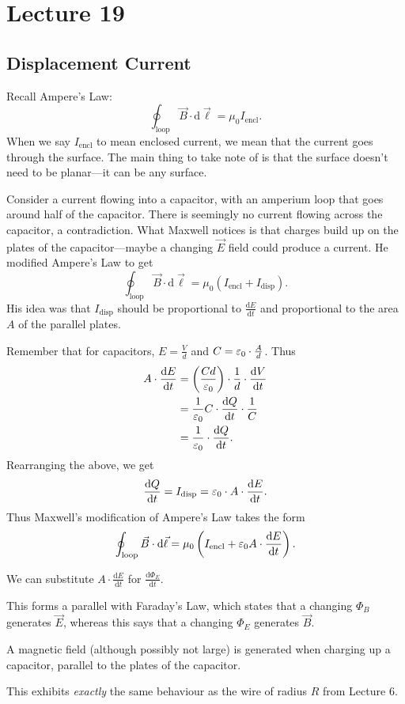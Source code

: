 \documentclass[class=article, crop=false]{standalone}
\begin{document}
  \section{Lecture 19}
  \subsection{Displacement Current}
  Recall Ampere's Law:
  \[
    \oint_\text{loop}\vec{B}\cdot \mathrm{d}\vec{\ell} = \mu_0I_\text{encl}.
  \]
  When we say $I_\text{encl}$ to mean enclosed current, we mean that the current goes through the surface. The main thing to take note of is that the surface doesn't need to be planar---it can be any surface. \par
  Consider a current flowing into a capacitor, with an amperium loop that goes around half of the capacitor. There is seemingly no current flowing across the capacitor, a contradiction. What Maxwell notices is that charges build up on the plates of the capacitor---maybe a changing $\vec{E}$ field could produce a current. He modified Ampere's Law to get
  \[
    \oint_\text{loop}\vec{B}\cdot \mathrm{d}\vec{\ell} = \mu_0(I_\text{encl} + I_\text{disp}).
  \]
  His idea was that $I_\text{disp}$ should be proportional to $\frac{\mathrm{d}E}{\mathrm{d}t}$ and proportional to the area $A$ of the parallel plates. \par
  Remember that for capacitors, $E = \frac{V}{d}$ and $C = \varepsilon_0\cdot \frac{A}{d}$. Thus
  \begin{align*}
    A\cdot \frac{\mathrm{d}E}{\mathrm{d}t} &= \left( \frac{Cd}{\varepsilon_0} \right)\cdot \frac{1}{d}\cdot \frac{\mathrm{d}V}{\mathrm{d}t} \\
                                           &= \frac{1}{\varepsilon_0}C\cdot \frac{\mathrm{d}Q}{\mathrm{d}t}\cdot \frac{1}{C} \\
                                           &= \frac{1}{\varepsilon_0}\cdot \frac{\mathrm{d}Q}{\mathrm{d}t}.
  \end{align*}
  Rearranging the above, we get
  \[
    \frac{\mathrm{d}Q}{\mathrm{d}t} = I_\text{disp} = \varepsilon_0\cdot A\cdot \frac{\mathrm{d}E}{\mathrm{d}t}.
  \]
  Thus Maxwell's modification of Ampere's Law takes the form
  \[
    \oint_\text{loop}\vec{B}\cdot \mathrm{d}\vec{\ell} = \mu_0\left( I_\text{encl} + \varepsilon_0A\cdot \frac{\mathrm{d}E}{\mathrm{d}t} \right).
  \]
  \begin{note}{}
    We can substitute $A\cdot \frac{\mathrm{d}E}{\mathrm{d}t}$ for $\frac{\mathrm{d}\Phi_E}{\mathrm{d}t}$.
  \end{note}
  This forms a parallel with Faraday's Law, which states that a changing $\Phi_B$ generates $\vec{E}$, whereas this says that a changing $\Phi_E$ generates $\vec{B}$.
  \begin{note}{}
    A magnetic field (although possibly not large) is generated when charging up a capacitor, parallel to the plates of the capacitor.
  \end{note}
  \begin{note}{}
    This exhibits \emph{exactly} the same behaviour as the wire of radius $R$ from Lecture $6$.
  \end{note}
\end{document}
